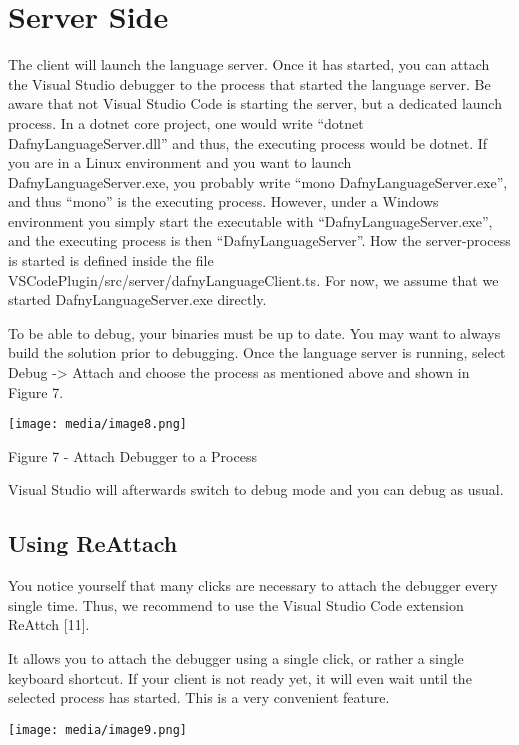 \documentclass[]{book}
\begin{document}
\section{Server Side}\label{server-side}

The client will launch the language server. Once it has started, you can attach the Visual Studio debugger to the process that started the language server. Be aware that not Visual Studio Code is starting the server, but a dedicated launch process. In a dotnet core project, one would write ``dotnet DafnyLanguageServer.dll'' and thus, the executing process would be dotnet. If you are in a Linux environment and you want to launch DafnyLanguageServer.exe, you probably write ``mono DafnyLanguageServer.exe'', and thus ``mono'' is the executing process. However, under a Windows environment you simply start the executable with ``DafnyLanguageServer.exe'', and the executing process is then ``DafnyLanguageServer''. How the server-process is started is defined inside the file VSCodePlugin/src/server/dafnyLanguageClient.ts\emph{.} For now, we assume that we started DafnyLanguageServer.exe directly.

To be able to debug, your binaries must be up to date. You may want to always build the solution prior to debugging. Once the language server is running, select Debug -\textgreater{} Attach and choose the process as mentioned above and shown in Figure 7.

\texttt{[image: media/image8.png]}

\protect\hypertarget{_Ref26822839}{}{}Figure 7 - Attach Debugger to a Process

Visual Studio will afterwards switch to debug mode and you can debug as usual.

\subsection{Using ReAttach}\label{using-reattach}

You notice yourself that many clicks are necessary to attach the debugger every single time. Thus, we recommend to use the Visual Studio Code extension ReAttch {[}11{]}.

It allows you to attach the debugger using a single click, or rather a single keyboard shortcut. If your client is not ready yet, it will even wait until the selected process has started. This is a very convenient feature.

\texttt{[image: media/image9.png]}
\end{document}
